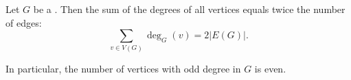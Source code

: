 \begin{theorem} \label{theorem:handshaking_lemma_sum_of_degrees_equals_twice_the_number_of_edges}
Let $G$ be a . Then the sum of the degrees of all vertices equals twice the number of edges:
$$\sum_{v \in V(G)} \deg_G(v) = 2|E(G)|.$$

In particular, the number of vertices with odd degree in $G$ is even.
\end{theorem}
